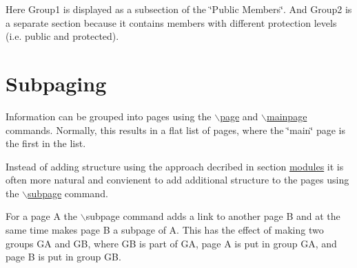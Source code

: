 Here Group1 is displayed as a subsection of the \char`\"{}Public Members\char`\"{}. And Group2 is a separate section because it contains members with different protection levels (i.e. public and protected).

\hypertarget{grouping_subpaging}{}\section{Subpaging}\label{grouping_subpaging}
Information can be grouped into pages using the \hyperlink{commands_cmdpage}{$\backslash$page} and \hyperlink{commands_cmdsubpage}{$\backslash$mainpage} commands. Normally, this results in a flat list of pages, where the \char`\"{}main\char`\"{} page is the first in the list.

Instead of adding structure using the approach decribed in section \hyperlink{grouping_modules}{modules} it is often more natural and convienent to add additional structure to the pages using the \hyperlink{commands_cmdsubpage}{$\backslash$subpage} command.

For a page A the $\backslash$subpage command adds a link to another page B and at the same time makes page B a subpage of A. This has the effect of making two groups GA and GB, where GB is part of GA, page A is put in group GA, and page B is put in group GB.

 